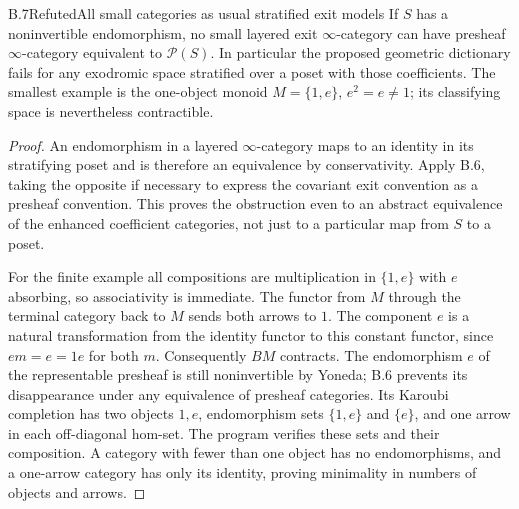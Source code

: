 \begin{statement}{B.7}{Refuted}{All small categories as usual stratified exit models}
If $S$ has a noninvertible endomorphism, no small layered exit
$\infty$-category can have presheaf $\infty$-category equivalent to
$\mathcal P(S)$. In particular the proposed geometric dictionary fails
for any exodromic space stratified over a poset with those coefficients.
The smallest example is the one-object monoid
$M=\{1,e\}$, $e^2=e\ne1$; its classifying space is nevertheless
contractible.
\end{statement}
\begin{proof}
An endomorphism in a layered $\infty$-category maps to an identity in its
stratifying poset and is therefore an equivalence by conservativity.
Apply B.6, taking the opposite if necessary to express the covariant
exit convention as a presheaf convention. This proves the obstruction
even to an abstract equivalence of the enhanced coefficient categories,
not just to a particular map from $S$ to a poset.

For the finite example all compositions are multiplication in
$\{1,e\}$ with $e$ absorbing, so associativity is immediate. The functor
from $M$ through the terminal category back to $M$ sends both arrows to
$1$. The component $e$ is a natural transformation from the identity
functor to this constant functor, since $em=e=1e$ for both $m$.
Consequently $BM$ contracts. The endomorphism $e$ of the representable
presheaf is still noninvertible by Yoneda; B.6 prevents its disappearance
under any equivalence of presheaf categories. Its Karoubi completion has
two objects $1,e$, endomorphism sets $\{1,e\}$ and $\{e\}$, and
one arrow in each off-diagonal hom-set. The program verifies these sets
and their composition. A category with fewer than one object has no
endomorphisms, and a one-arrow category has only its identity, proving
minimality in numbers of objects and arrows.
\end{proof}


